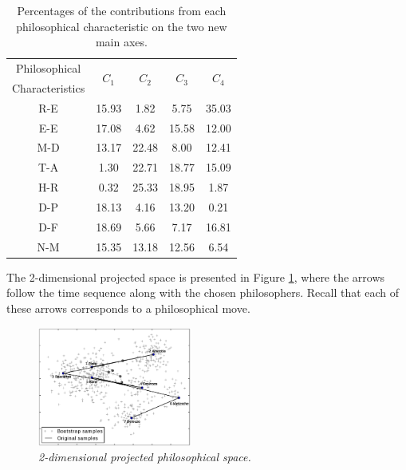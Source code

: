 \documentclass[%
 aip,
 jmp,%
 amsmath,amssymb,
 reprint,%
]{revtex4-1}
\begin{document}
\begin{table}%
\caption{\label{tab:Deviates}Percentages of
the contributions from each philosophical characteristic on the two new main axes.  }
\begin{tabular}{|c||c|c|c|c|}
\hline
Philosophical & \multirow{2}{*}{$C_1$} & \multirow{2}{*}{$C_2$} & \multirow{2}{*}{$C_3$} & \multirow{2}{*}{$C_4$}\\
Characteristics & & & & \\
\hline
R-E & 15.93   &  1.82 &  5.75 & 35.03 \\
E-E & 17.08   &  4.62 & 15.58 & 12.00 \\
M-D & 13.17   & 22.48 &  8.00 & 12.41 \\
T-A &  1.30   & 22.71 & 18.77 & 15.09 \\
H-R &  0.32   & 25.33 & 18.95 &  1.87 \\
D-P & 18.13   &  4.16 & 13.20 &  0.21 \\
D-F & 18.69   &  5.66 &  7.17 & 16.81 \\
N-M & 15.35   & 13.18 & 12.56 &  6.54 \\
\hline

\end{tabular}
\end{table}

The 2-dimensional projected space is presented in Figure
\ref{fig:pca}, where the arrows follow the time sequence along with
the chosen philosophers.  Recall that each of these arrows corresponds
to a philosophical move.  



\begin{figure}
        \begin{center}
                \includegraphics[width=0.45\textwidth]{pca_filosofos_novo}
        \end{center}
        \caption{\it 2-dimensional projected philosophical space.}
        \label{fig:pca}
\end{figure}
\end{document}
